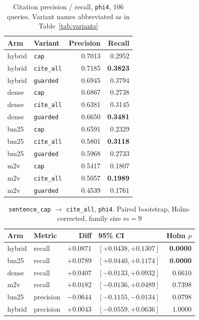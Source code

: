 \documentclass[conference]{IEEEtran}
\begin{document}
\begin{table}[t]
\caption{Citation precision / recall, \texttt{phi4}, 106 queries.
Variant names abbreviated as in Table~\ref{tab:variants}}
\label{tab:phi4}
\setlength{\tabcolsep}{4pt}
\centering
\small
\begin{tabular}{llrr}
\toprule
Arm & Variant & Precision & Recall \\
\midrule
hybrid & \texttt{cap}     & 0.7013 & 0.2952 \\
hybrid & \texttt{cite\_all} & 0.7185 & \textbf{0.3823} \\
hybrid & \texttt{guarded} & 0.6945 & 0.3794 \\
\midrule
dense  & \texttt{cap}     & 0.6867 & 0.2738 \\
dense  & \texttt{cite\_all} & 0.6381 & 0.3145 \\
dense  & \texttt{guarded} & 0.6650 & \textbf{0.3481} \\
\midrule
bm25   & \texttt{cap}     & 0.6591 & 0.2329 \\
bm25   & \texttt{cite\_all} & 0.5801 & \textbf{0.3118} \\
bm25   & \texttt{guarded} & 0.5968 & 0.2733 \\
\midrule
m2v    & \texttt{cap}     & 0.5417 & 0.1807 \\
m2v    & \texttt{cite\_all} & 0.5057 & \textbf{0.1989} \\
m2v    & \texttt{guarded} & 0.4539 & 0.1761 \\
\bottomrule
\end{tabular}
\end{table}

\begin{table}[t]
\caption{\texttt{sentence\_cap} $\rightarrow$ \texttt{cite\_all}, \texttt{phi4}.
Paired bootstrap, Holm-corrected, family size $m=9$}
\label{tab:family2}
\setlength{\tabcolsep}{4pt}
\centering
\small
\begin{tabular}{llrlr}
\toprule
Arm & Metric & Diff & 95\% CI & Holm $p$ \\
\midrule
hybrid & recall    & $+0.0871$ & $[+0.0438,+0.1307]$ & \textbf{0.0000} \\
bm25   & recall    & $+0.0789$ & $[+0.0440,+0.1174]$ & \textbf{0.0000} \\
dense  & recall    & $+0.0407$ & $[-0.0133,+0.0932]$ & 0.6610 \\
m2v    & recall    & $+0.0182$ & $[-0.0136,+0.0489]$ & 0.7398 \\
bm25   & precision & $-0.0644$ & $[-0.1155,-0.0134]$ & 0.0798 \\
hybrid & precision & $+0.0043$ & $[-0.0559,+0.0636]$ & 1.0000 \\
\bottomrule
\end{tabular}
\end{table}
\end{document}
